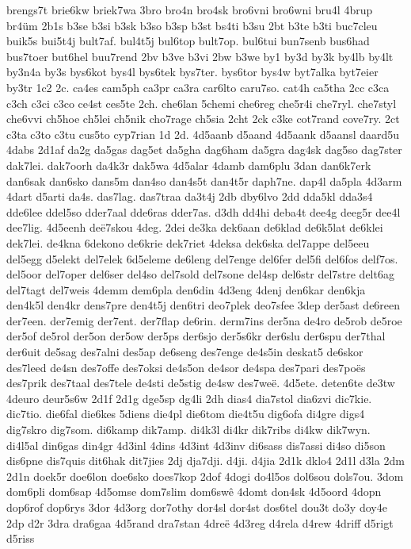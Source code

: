 brengs7t
brie6kw
briek7wa
3bro
bro4n
bro4sk
bro6vni
bro6wni
bru4l
4brup
br4üm
2b1s
b3se
b3si
b3sk
b3so
b3sp
b3st
bs4ti
b3su
2bt
b3te
b3ti
buc7cleu
buik5s
bui5t4j
bult7af.
bul4t5j
bul6top
bult7op.
bul6tui
bun7senb
bus6had
bus7toer
but6hel
buu7rend
2bv
b3ve
b3vi
2bw
b3we
by1
by3d
by3k
by4lb
by4lt
by3n4a
by3s
bys6kot
bys4l
bys6tek
bys7ter.
bys6tor
bys4w
byt7alka
byt7eier
by3tr
1c2
2c.
ca4es
cam5ph
ca3pr
ca3ra
car6lto
caru7so.
cat4h
ca5tha
2cc
c3ca
c3ch
c3ci
c3co
ce4st
ces5te
2ch.
che6lan
5chemi
che6reg
che5r4i
che7ryl.
che7styl
che6vvi
ch5hoe
ch5lei
ch5nik
cho7rage
ch5sia
2cht
2ck
c3ke
cot7rand
cove7ry.
2ct
c3ta
c3to
c3tu
cus5to
cyp7rian
1d
2d.
4d5aanb
d5aand
4d5aank
d5aansl
daard5u
4dabs
2d1af
da2g
da5gas
dag5et
da5gha
dag6ham
da5gra
dag4sk
dag5so
dag7ster
dak7lei.
dak7oorh
da4k3r
dak5wa
4d5alar
4damb
dam6plu
3dan
dan6k7erk
dan6sak
dan6sko
dans5m
dan4so
dan4s5t
dan4t5r
daph7ne.
dap4l
da5pla
4d3arm
4dart
d5arti
da4s.
das7lag.
das7traa
da3t4j
2db
dby6lvo
2dd
dda5kl
dda3s4
dde6lee
ddel5so
dder7aal
dde6ras
dder7as.
d3dh
dd4hi
deba4t
dee4g
deeg5r
dee4l
dee7lig.
4d5eenh
deë7skou
4deg.
2dei
de3ka
dek6aan
de6klad
de6k5lat
de6klei
dek7lei.
de4kna
6dekono
de6krie
dek7riet
4deksa
dek6ska
del7appe
del5eeu
del5egg
d5elekt
del7elek
6d5eleme
de6leng
del7enge
del6fer
del5fi
del6fos
delf7os.
del5oor
del7oper
del6ser
del4so
del7sold
del7sone
del4sp
del6str
del7stre
delt6ag
del7tagt
del7weis
4demm
dem6pla
den6din
4d3eng
4denj
den6kar
den6kja
den4k5l
den4kr
dens7pre
den4t5j
den6tri
deo7plek
deo7sfee
3dep
der5ast
de6reen
der7een.
der7emig
der7ent.
der7flap
de6rin.
derm7ins
der5na
de4ro
de5rob
de5roe
der5of
de5rol
der5on
der5ow
der5ps
der6sjo
der5s6kr
der6slu
der6spu
der7thal
der6uit
de5sag
des7alni
des5ap
de6seng
des7enge
de4s5in
deskat5
de6skor
des7leed
de4sn
des7offe
des7oksi
de4s5on
de4sor
de4spa
des7pari
des7poës
des7prik
des7taal
des7tele
de4sti
de5stig
de4sw
des7weë.
4d5ete.
deten6te
de3tw
4deuro
deur5s6w
2d1f
2d1g
dge5sp
dg4li
2dh
dias4
dia7stol
dia6zvi
dic7kie.
dic7tio.
die6fal
die6kes
5diens
die4pl
die6tom
die4t5u
dig6ofa
di4gre
digs4
dig7skro
dig7som.
di6kamp
dik7amp.
di4k3l
di4kr
dik7ribs
di4kw
dik7wyn.
di4l5al
din6gas
din4gr
4d3inl
4dins
4d3int
4d3inv
di6sass
dis7assi
di4so
di5son
dis6pne
dis7quis
dit6hak
dit7jies
2dj
dja7dji.
d4ji.
d4jia
2d1k
dklo4
2d1l
d3la
2dm
2d1n
doek5r
doe6lon
doe6sko
does7kop
2dof
4dogi
do4l5os
dol6sou
dols7ou.
3dom
dom6pli
dom6sap
4d5omse
dom7slim
dom6swê
4domt
don4sk
4d5oord
4dopn
dop6rof
dop6rys
3dor
4d3org
dor7othy
dor4sl
dor4st
dos6tel
dou3t
do3y
doy4e
2dp
d2r
3dra
dra6gaa
4d5rand
dra7stan
4dreë
4d3reg
d4rela
d4rew
4driff
d5rigt
d5riss
